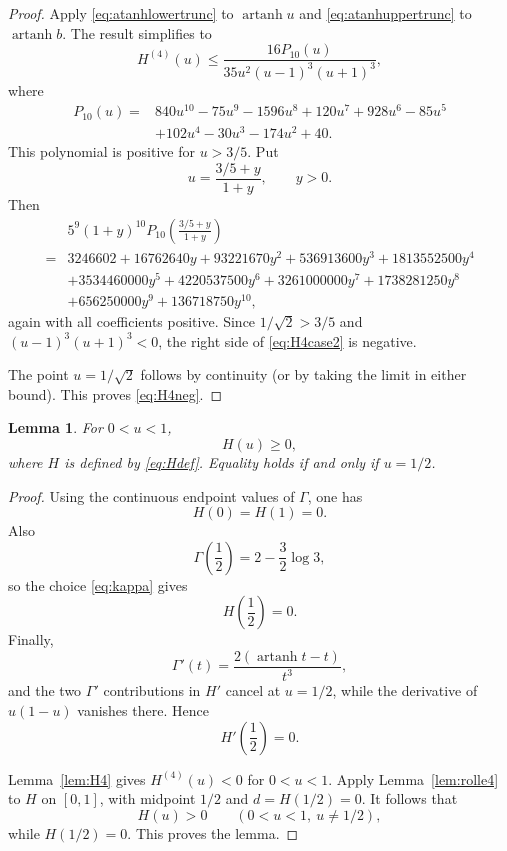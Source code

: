\documentclass[11pt]{article}
\newtheorem{lemma}[theorem]{Lemma}
\theoremstyle{definition}
\theoremstyle{remark}
\newcommand{\artanh}{\operatorname{artanh}}
\begin{document}
\begin{proof}
Apply \eqref{eq:atanhlowertrunc} to $\artanh u$ and \eqref{eq:atanhuppertrunc} to $\artanh b$.  The result simplifies to
\begin{equation}
\label{eq:H4case2}
H^{(4)}(u)
\le
\frac{16P_{10}(u)}{35u^2(u-1)^3(u+1)^3},
\end{equation}
where
\begin{align*}
P_{10}(u)={}&
840u^{10}-75u^9-1596u^8+120u^7+928u^6
-85u^5\\
&+102u^4-30u^3-174u^2+40.
\end{align*}
This polynomial is positive for $u>3/5$.  Put
\[
u=\frac{3/5+y}{1+y},
\qquad y>0.
\]
Then
\begin{align*}
&5^9(1+y)^{10}P_{10}\left(\frac{3/5+y}{1+y}\right)\\
={}&3246602+16762640y+93221670y^2+536913600y^3
+1813552500y^4\\
&+3534460000y^5+4220537500y^6+3261000000y^7
+1738281250y^8\\
&+656250000y^9+136718750y^{10},
\end{align*}
again with all coefficients positive.  Since $1/\sqrt2>3/5$ and $(u-1)^3(u+1)^3<0$, the right side of \eqref{eq:H4case2} is negative.

The point $u=1/\sqrt2$ follows by continuity (or by taking the limit in either bound).  This proves \eqref{eq:H4neg}.
\end{proof}

\begin{lemma}
\label{lem:H}
For $0<u<1$,
\begin{equation}
\label{eq:Hpositive}
H(u)\ge0,
\end{equation}
where $H$ is defined by \eqref{eq:Hdef}.  Equality holds if and only if $u=1/2$.
\end{lemma}

\begin{proof}
Using the continuous endpoint values of $\Gamma$, one has
\[
H(0)=H(1)=0.
\]
Also
\[
\Gamma\left(\frac12\right)
=2-\frac32\log3,
\]
so the choice \eqref{eq:kappa} gives
\[
H\left(\frac12\right)=0.
\]
Finally,
\[
\Gamma'(t)=\frac{2(\artanh t-t)}{t^3},
\]
and the two $\Gamma'$ contributions in $H'$ cancel at $u=1/2$, while the derivative of $u(1-u)$ vanishes there.  Hence
\[
H'\left(\frac12\right)=0.
\]

Lemma~\ref{lem:H4} gives $H^{(4)}(u)<0$ for $0<u<1$.  Apply Lemma~\ref{lem:rolle4} to $H$ on $[0,1]$, with midpoint $1/2$ and $d=H(1/2)=0$.  It follows that
\[
H(u)>0
\qquad
(0<u<1,\ u\ne1/2),
\]
while $H(1/2)=0$.  This proves the lemma.
\end{proof}
\end{document}
